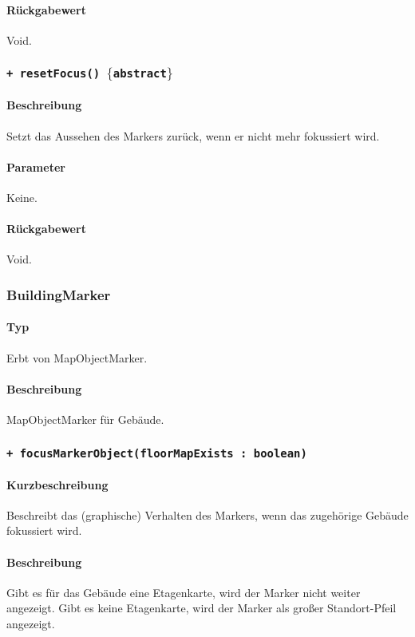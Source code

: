 \paragraph*{Rückgabewert}
Void.

\subsubsection*{\texttt{+ resetFocus() $\lbrace$abstract$\rbrace$}}%
\paragraph*{Beschreibung}
Setzt das Aussehen des Markers zurück, wenn er nicht mehr fokussiert wird.
\paragraph*{Parameter}
Keine.
\paragraph*{Rückgabewert}
Void.

\subsubsection{BuildingMarker}
\paragraph*{Typ} 
Erbt von MapObjectMarker.
\paragraph*{Beschreibung}
MapObjectMarker für Gebäude.

\subsubsection*{\texttt{+ focusMarkerObject(floorMapExists : boolean)}}%
\paragraph*{Kurzbeschreibung}
Beschreibt das (graphische) Verhalten des Markers, wenn das zugehörige Gebäude fokussiert wird.
\paragraph*{Beschreibung}
Gibt es für das Gebäude eine Etagenkarte, wird der Marker nicht weiter angezeigt.
Gibt es keine Etagenkarte, wird der Marker als großer Standort-Pfeil angezeigt.
